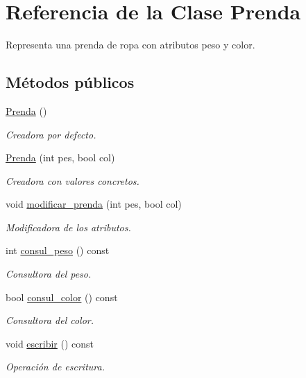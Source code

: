 \hypertarget{class_prenda}{\section{Referencia de la Clase Prenda}
\label{class_prenda}
}


Representa una prenda de ropa con atributos peso y color.  


\subsection*{Métodos públicos}
\begin{DoxyCompactItemize}
\item 
\hyperlink{class_prenda_adfd86b131c7f40c58b0cb4200eb55129}{Prenda} ()
\begin{DoxyCompactList}\small\item\em Creadora por defecto. \end{DoxyCompactList}\item 
\hyperlink{class_prenda_af15ff723083040b89bc495b4ec4b914e}{Prenda} (int pes, bool col)
\begin{DoxyCompactList}\small\item\em Creadora con valores concretos. \end{DoxyCompactList}\item 
void \hyperlink{class_prenda_a598bccf93cb8aa217a8533c0307c686f}{modificar\-\_\-prenda} (int pes, bool col)
\begin{DoxyCompactList}\small\item\em Modificadora de los atributos. \end{DoxyCompactList}\item 
int \hyperlink{class_prenda_ae886133326d46cc18dd9070d317a3ccb}{consul\-\_\-peso} () const 
\begin{DoxyCompactList}\small\item\em Consultora del peso. \end{DoxyCompactList}\item 
bool \hyperlink{class_prenda_a149632ba71127621c52917ef2e936c2e}{consul\-\_\-color} () const 
\begin{DoxyCompactList}\small\item\em Consultora del color. \end{DoxyCompactList}\item 
void \hyperlink{class_prenda_a3a5dfb75467c54157ec969b8ab7d752b}{escribir} () const 
\begin{DoxyCompactList}\small\item\em Operación de escritura. \end{DoxyCompactList}\end{DoxyCompactItemize}


